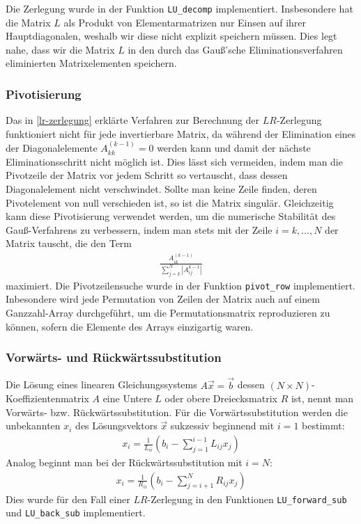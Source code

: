 \documentclass[10pt,a4paper]{article}
\begin{document}
Die Zerlegung wurde in der Funktion \texttt{LU\_decomp} implementiert. Insbesondere hat die Matrix $L$ als Produkt von Elementarmatrizen nur Einsen auf ihrer Hauptdiagonalen, weshalb wir diese nicht explizit speichern müssen. Dies legt nahe, dass wir die Matrix $L$ in den durch das Gauß'sche Eliminationsverfahren eliminierten Matrixelementen speichern.

\subsubsection{Pivotisierung}
\label{pivotisierung}
Das in \ref{lr-zerlegung} erklärte Verfahren zur Berechnung der $LR$-Zerlegung funktioniert nicht für jede invertierbare Matrix, da während der Elimination eines der Diagonalelemente $A^{(k-1)}_{kk} = 0$ werden kann und damit der nächste Eliminationsschritt nicht möglich ist. Dies lässt sich vermeiden, indem man die Pivotzeile der Matrix vor jedem Schritt so vertauscht, dass dessen Diagonalelement nicht verschwindet. Sollte man keine Zeile finden, deren Pivotelement von null verschieden ist, so ist die Matrix singulär. Gleichzeitig kann diese Pivotisierung verwendet werden, um die numerische Stabilität des Gauß-Verfahrens zu verbessern, indem man stets mit der Zeile $i = k, \dots, N$ der Matrix tauscht, die den Term
\begin{align}
	\frac{A^{(k-1)}_{ik}}{\sum_{j=k}^N \left|A^{k-1}_{ij}\right| }
\end{align}
maximiert. Die Pivotzeilensuche wurde in der Funktion \texttt{pivot\_row} implementiert. Inbesondere wird jede Permutation von Zeilen der Matrix auch auf einem Ganzzahl-Array durchgeführt, um die Permutationsmatrix reproduzieren zu können, sofern die Elemente des Arrays einzigartig waren.

\subsubsection{Vorwärts- und Rückwärtssubstitution}
Die Lösung eines linearen Gleichungssystems $A\vec{x} = \vec{b}$ dessen $(N \times N)$-Koeffizientenmatrix $A$ eine Untere $L$ oder obere Dreiecksmatrix $R$ ist, nennt man Vorwärts- bzw. Rückwärtssubstitution. Für die Vorwärtssubstitution werden die unbekannten $x_i$ des Lösungsvektors $\vec{x}$ sukzessiv beginnend mit $i = 1$ bestimmt:
\begin{align}
	x_i = \frac{1}{L_{ii}} \left( b_i - \sum_{j = 1}^{i-1} L_{ij} x_j \right)
\end{align}
Analog beginnt man bei der Rückwärtssubstitution mit $i = N$:
\begin{align}
	x_i = \frac{1}{R_{ii}} \left( b_i - \sum_{j=i+1}^{N} R_{ij} x_j \right)
\end{align}
Dies wurde für den Fall einer $LR$-Zerlegung in den Funktionen \texttt{LU\_forward\_sub} und \texttt{LU\_back\_sub} implementiert.
\end{document}
